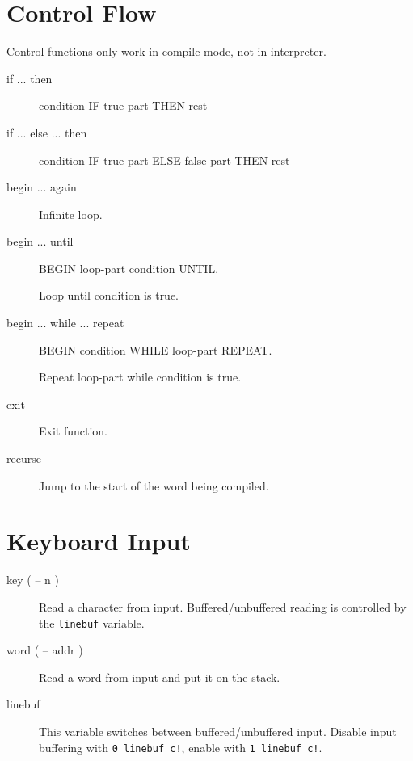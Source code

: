 \section{Control Flow}

Control functions only work in compile mode, not in interpreter.

\begin{description}
\item[if ... then]

condition IF true-part THEN rest

\item[if ... else ... then]

condition IF true-part ELSE false-part THEN rest

\item[begin ... again]

Infinite loop.

\item[begin ... until]

BEGIN loop-part condition UNTIL.

Loop until condition is true.

\item[begin ... while ... repeat]

BEGIN condition WHILE loop-part REPEAT.

Repeat loop-part while condition is true.

\item[exit]

Exit function.

\item[recurse] Jump to the start of the word being compiled.

\end{description}

\section{Keyboard Input}

\begin{description}
\item[key ( -- n )]

Read a character from input. Buffered/unbuffered reading is controlled by the \texttt{linebuf} variable.

\item[word ( -- addr )] Read a word from input and put it on the stack.

\item[linebuf]

This variable switches between buffered/unbuffered input. Disable input buffering with \texttt{0 linebuf c!}, enable with \texttt{1 linebuf c!}.

\end{description}

